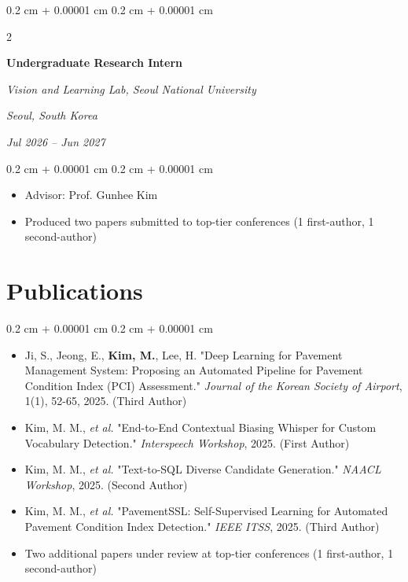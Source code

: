\documentclass[10pt, letterpaper]{article}
\newenvironment{highlights}{
    \begin{itemize}[
        topsep=0.10 cm,
        parsep=0.10 cm,
        partopsep=0pt,
        itemsep=0pt,
        leftmargin=0.4 cm + 10pt
    ]
}{
    \end{itemize}
} %
\newenvironment{highlightsforbulletentries}{
    \begin{itemize}[
        topsep=0.10 cm,
        parsep=0.10 cm,
        partopsep=0pt,
        itemsep=0pt,
        leftmargin=10pt
    ]
}{
    \end{itemize}
} %
\newenvironment{onecolentry}{
    \begin{adjustwidth}{
        0.2 cm + 0.00001 cm
    }{
        0.2 cm + 0.00001 cm
    }
}{
    \end{adjustwidth}
} %
\newenvironment{twocolentry}[2][]{
    \onecolentry
    \def\secondColumn{#2}
    \setcolumnwidth{\fill, 4.5 cm}
    \begin{paracol}{2}
}{
    \switchcolumn \raggedleft \secondColumn
    \end{paracol}
    \endonecolentry
} %
\begin{document}
        \vspace{0.2 cm}

        \begin{twocolentry}{
        \textit{Seoul, South Korea}    
            
        \textit{Jul 2026 – Jun 2027}}
            \textbf{Undergraduate Research Intern}
            
            \textit{Vision and Learning Lab, Seoul National University}
        \end{twocolentry}

        \vspace{0.10 cm}
        \begin{onecolentry}
            \begin{highlights}
                \item Advisor: Prof. Gunhee Kim
                \item Produced two papers submitted to top-tier conferences (1 first-author, 1 second-author)
            \end{highlights}
        \end{onecolentry}

        \vspace{0.2 cm}
    
    \section{Publications}
        
        \begin{onecolentry}
            \begin{highlightsforbulletentries}
                \item Ji, S., Jeong, E., \textbf{Kim, M.}, Lee, H. "Deep Learning for Pavement Management System: Proposing an Automated Pipeline for Pavement Condition Index (PCI) Assessment." \textit{Journal of the Korean Society of Airport}, 1(1), 52-65, 2025. (Third Author)
                \item Kim, M. M., \textit{et al.} "End-to-End Contextual Biasing Whisper for Custom Vocabulary Detection." \textit{Interspeech Workshop}, 2025. (First Author)
                \item Kim, M. M., \textit{et al.} "Text-to-SQL Diverse Candidate Generation." \textit{NAACL Workshop}, 2025. (Second Author)
                \item Kim, M. M., \textit{et al.} "PavementSSL: Self-Supervised Learning for Automated Pavement Condition Index Detection." \textit{IEEE ITSS}, 2025. (Third Author)
                \item Two additional papers under review at top-tier conferences (1 first-author, 1 second-author)
            \end{highlightsforbulletentries}
        \end{onecolentry}
\end{document}
